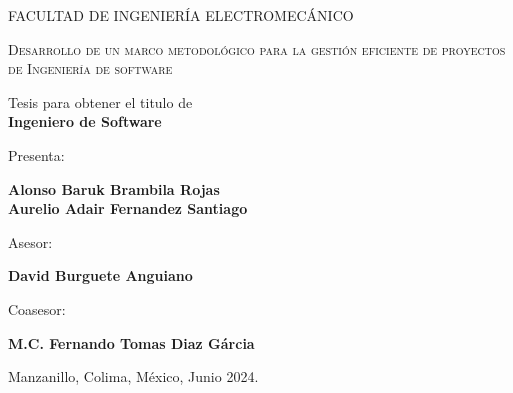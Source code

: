 \begin{titlepage}
\begin{center}
			FACULTAD DE INGENIERÍA ELECTROMECÁNICO\\
			\vspace*{0.75in}
			\begin{huge}
				\textsc{Desarrollo de un marco metodológico para la gestión eficiente de proyectos de Ingeniería de software}\\ %
			\end{huge}
			\vspace*{0.2in}
			\begin{Large}
			    Tesis para obtener el titulo de\\
				\textbf{Ingeniero de Software} \\
			\end{Large}
			\vspace*{0.3in}
			\begin{large}
				Presenta:\\
			\end{large}
			\begin{large}
				\textbf{Alonso Baruk Brambila Rojas}\\
				\textbf{Aurelio Adair Fernandez Santiago}\\
			\end{large}
			\vspace*{0.3in}
			\begin{large}
				Asesor:\\
			\end{large}
			\begin{large}
				\textbf{David Burguete Anguiano}\\
			\end{large}
			\vspace*{0.3in}
			\begin{large}
				Coasesor:\\
			\end{large}
			\begin{large}
				\textbf{M.C. Fernando Tomas Diaz Gárcia}\\
			\end{large}
			\vspace*{0.3in}
			\vspace*{0.1in}
			\begin{large}
				Manzanillo, Colima, México, Junio 2024.
			\end{large}
		\end{center}
		
	\end{titlepage}